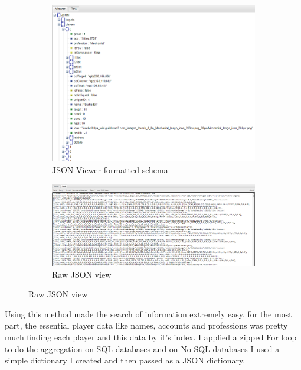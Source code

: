 \documentclass[12pt,a4paper]{article}
\begin{document}
    \begin{figure}[h!]
        \centering
        \begin{subfigure}[b]{0.8\linewidth}
          \includegraphics[width=\linewidth]{Images/json_schema.png}
          \caption{JSON Viewer formatted schema}
        \end{subfigure}

        \begin{subfigure}[b]{0.8\linewidth}
          \includegraphics[width=\linewidth]{Images/json_raw.png}
          \caption{Raw JSON view}
        \end{subfigure}
    \end{figure}

    \newpage

    Using this method made the search of information extremely easy, for the most part, the essential
    player data like names, accounts and professions was pretty much finding each player and this data
    by it's index. I applied a zipped For loop to do the aggregation on SQL databases and on No-SQL databases
    I used a simple dictionary I created and then passed as a JSON dictionary.\\
\end{document}
